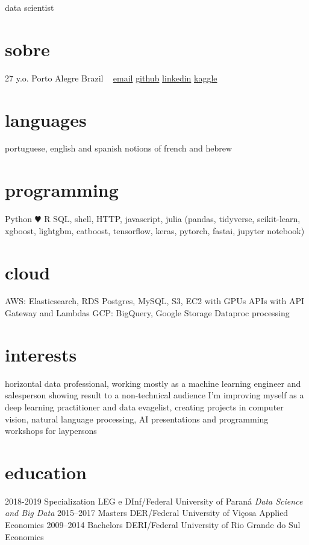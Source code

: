 \documentclass[]{friggeri-cv}
\begin{document}
       {data scientist}


\begin{aside}
  \section{sobre}
    27 y.o. 
    Porto Alegre
    Brazil
    ~
    \href{mailto:jt\_anchante@hotmail.com}{email}
    \href{https://github.com/jayme-anchante/}{github}
    \href{https://www.linkedin.com/in/jayme-anchante}{linkedin}
    \href{https://www.kaggle.com/jaymeanchante}{kaggle}
  \section{languages}
    portuguese, english and spanish
    notions of french and hebrew
  \section{programming}
    Python {\color{red} $\varheartsuit$} R
    SQL, shell, HTTP,
    javascript, julia
    (pandas, tidyverse,
    scikit-learn, xgboost,
    lightgbm, catboost,
    tensorflow, keras,
    pytorch, fastai,
    jupyter notebook)
  \section{cloud}
    AWS:
    Elasticsearch, RDS Postgres, MySQL,
    S3, EC2 with GPUs
    APIs with API Gateway and Lambdas
    GCP:
    BigQuery, Google Storage
    Dataproc processing
\end{aside}

\section{interests}

horizontal data professional, working mostly as a machine learning engineer and
salesperson showing result to a non-technical audience
I'm improving myself as a deep learning practitioner and data evagelist,
creating projects in computer vision, natural language processing,
AI presentations and programming workshops for laypersons

\section{education}

\begin{entrylist}
  \entry
    {2018-2019}
    {Specialization}
    {LEG e DInf/Federal University of Paraná}
    {\emph{Data Science and Big Data}}
  \entry
    {2015–2017}
    {Masters}
    {DER/Federal University of Viçosa}
    {Applied Economics}
  \entry
    {2009–2014}
    {Bachelors}
    {DERI/Federal University of Rio Grande do Sul}
    {Economics}
\end{entrylist}
\end{document}
